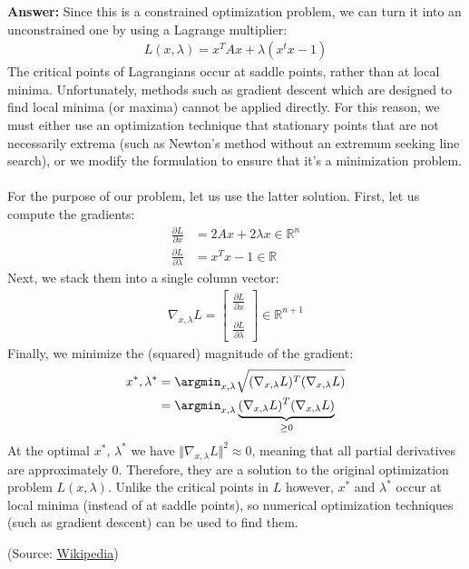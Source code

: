 \documentclass{article}
\newenvironment{QandA}{\begin{enumerate}[label=\arabic*.]}{\end{enumerate}}
\newenvironment{answer}{\par\normalfont \textbf{Answer:}}{}
\newcommand{\R}{\mathbb{R}}
\begin{document}
\begin{QandA}
    \begin{answer}
        Since this is a constrained optimization problem, we can turn it into an unconstrained one by using a Lagrange multiplier:
        \begin{align*}
            L(x, \lambda) = x^T A x + \lambda (x^t x - 1) 
        \end{align*}
        The critical points of Lagrangians occur at saddle points, rather than at local minima. Unfortunately, methods such as gradient descent which are designed to find local minima (or maxima) cannot be applied directly. For this reason, we must either use an optimization technique that stationary points that are not necessarily extrema (such as Newton's method without an extremum seeking line search), or we modify the formulation to ensure that it's a minimization problem. \\\\
        For the purpose of our problem, let us use the latter solution. First, let us compute the gradients:
        \begin{align*}
            \frac{\partial L}{ \partial x} &= 2Ax + 2 \lambda x \in \R^n \\ 
            \frac{\partial L}{\partial \lambda} &= x^T x - 1 \in \R
        \end{align*}
        Next, we stack them into a single column vector:
        \begin{align*}
            \nabla_{x, \lambda}L = 
            \begin{bmatrix}
             \frac{\partial L}{\partial x} \\
             \\
             \frac{\partial L}{\partial \lambda}
            \end{bmatrix} \in \R^{n + 1}
        \end{align*}
        Finally, we minimize the (squared) magnitude of the gradient:
        \begin{align*}
            x^{*}, \lambda^{*} &= \argmin_{x, \lambda} \sqrt{(\nabla_{x, \lambda}L)^T (\nabla_{x, \lambda}L)} \\
             &= \argmin_{x, \lambda} \underbrace{(\nabla_{x, \lambda}L)^T (\nabla_{x, \lambda}L)}_{\ge 0}
        \end{align*}
        At the optimal $x^{*}$, $\lambda^{*}$ we have $ \Vert \nabla_{x, \lambda}L \Vert ^2 \approx 0$, meaning that all partial derivatives are approximately $0$. Therefore, they are a solution to the original optimization problem $L(x, \lambda)$. Unlike the critical points in $L$ however, $x^{*}$ and $\lambda^{*}$ occur at local minima (instead of at saddle points), so numerical optimization techniques (such as gradient descent) can be used to find them. 
        
        (Source: \href{https://en.wikipedia.org/wiki/Lagrange_multiplier#Examples}{Wikipedia})
    \end{answer}
\end{QandA}
\end{document}

